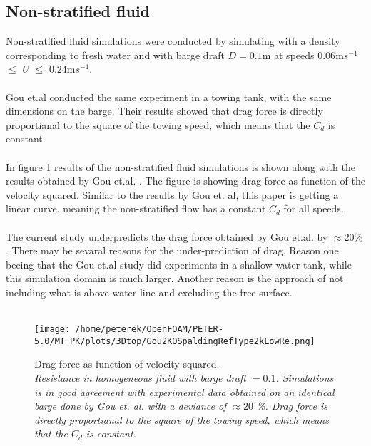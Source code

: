 \documentclass[a4paper, 12pt]{report}
\begin{document}
\subsection{Non-stratified fluid}
Non-stratified fluid simulations were conducted by simulating with a density corresponding to fresh water and with barge draft $D=0.1$m at speeds $0.06$m$s^{-1}$ $\leq$ $U$ $\leq$ $0.24$m$s^{-1}$. \\
\\
Gou et.al conducted the same experiment in a towing tank, with the same dimensions on the barge. Their results showed that drag force is directly proportianal to the square of the towing speed, which means that the $C_d$ is constant.\\
\\
In figure \ref{fig:dragForce} results of the non-stratified fluid simulations is shown along with the results obtained by Gou et.al. \cite{Gou}. The figure is showing drag force as function of the velocity squared. Similar to the results by Gou et. al, this paper is getting a linear curve, meaning the non-stratified flow has a constant $C_d$ for all speeds.\\
\\
The current study underpredicts the drag force obtained by Gou et.al. by $\approx 20\%$. There may be sevaral reasons for the under-prediction of drag. Reason one beeing that the Gou et.al study did experiments in a shallow water tank, while this simulation domain is much larger. Another reason is the approach of not including what is above water line and excluding the free surface.\\
\\
\begin{figure}[H]
	\centering
	\texttt{[image: /home/peterek/OpenFOAM/PETER-5.0/MT\_PK/plots/3Dtop/Gou2KOSpaldingRefType2kLowRe.png]}
	\caption{Drag force as function of velocity squared. \\ \textit{Resistance in homogeneous fluid with barge draft $=0.1$. Simulations is in good agreement with experimental data obtained on an identical barge done by Gou et. al. \cite{Gou} with a deviance of $\approx 20$ \%. Drag force is directly proportianal to the square of the towing speed, which means that the $C_d$ is constant. }}
	\label{fig:dragForce}
\end{figure}
\end{document}

